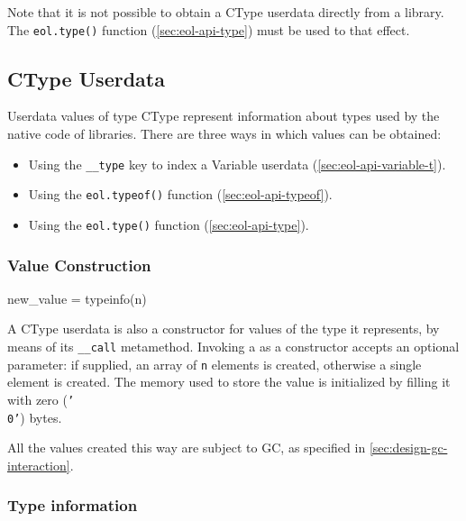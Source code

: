 Note that it is not possible to obtain a \textsf{CType} userdata directly from
a library. The \texttt{eol.type()} function (\autoref{sec:eol-api-type}) must
be used to that effect.


\subsection{CType Userdata}
	\label{sec:eol-api-ctype-t}

Userdata values of type \textsf{CType} represent information about types used
by the native code of libraries. There are three ways in which values can be
obtained:

\begin{itemize}

	\item Using the \texttt{\_\_type} key to index a \textsf{Variable}
	userdata (\autoref{sec:eol-api-variable-t}).

	\item Using the \texttt{eol.typeof()} function
	(\autoref{sec:eol-api-typeof}).

	\item Using the \texttt{eol.type()} function (\autoref{sec:eol-api-type}).

\end{itemize}


\subsubsection{Value Construction}

\begin{luacode}
new_value = typeinfo(n)
\end{luacode}

A \textsf{CType} userdata is also a \gls{constructor} for values of the type
it represents, by means of its \texttt{\_\_call} metamethod. Invoking
a \value{CType} as a constructor accepts an optional parameter: if supplied,
an array of \texttt{n} elements is created, otherwise a single element is
created. The memory used to store the value is initialized by filling it with
zero (\texttt{'\\0'}) bytes.

All the values created this way are subject to \gls{GC}, as specified in
\autoref{sec:design-gc-interaction}.


\subsubsection{Type information}


